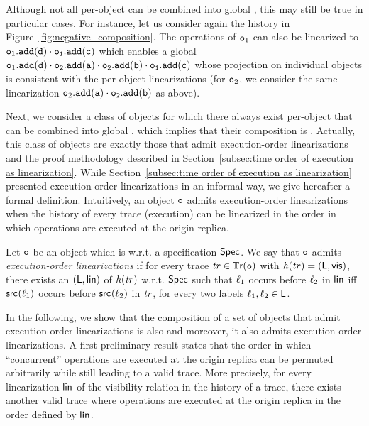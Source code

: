 Although not all per-object  can be combined into global , this may still be true in particular cases. For instance, let us consider again the history in Figure~\ref{fig:negative_composition}. The operations of $\mathtt{o}_1$ can also be linearized to $\aobj_1.\alabelshort[{\tt add}]{d}\cdot \aobj_1.\alabelshort[{\tt add}]{c}$ which enables a global \crdtlinearization{} $\aobj_1.\alabelshort[{\tt add}]{d}\cdot \aobj_2.\alabelshort[{\tt add}]{a}\cdot \aobj_2.\alabelshort[{\tt add}]{b}\cdot \aobj_1.\alabelshort[{\tt add}]{c}$ whose projection on individual objects is consistent with the per-object linearizations (for $\mathtt{o}_2$, we consider the same linearization $\aobj_2.\alabelshort[{\tt add}]{a}\cdot \aobj_2.\alabelshort[{\tt add}]{b}$ as above).

Next, we consider a class of \crdtlinearizable{} objects for which there always exist per-object  that can be combined into global , which implies that their composition is \crdtlinearizable{}. Actually, this class of objects are exactly those that admit execution-order linearizations and the proof methodology described in Section~\ref{subsec:time order of execution as linearization}. While Section~\ref{subsec:time order of execution as linearization} presented execution-order linearizations in an informal way, we give hereafter a formal definition. Intuitively, an object $\mathtt{o}$ admits execution-order linearizations when the history of every trace (execution) can be linearized in the order in which operations are executed at the origin replica.

\begin{definition}
Let $\mathtt{o}$ be an object which is \crdtlinearizable{} w.r.t. a specification $\mathsf{Spec}$. We say that $\mathtt{o}$ admits \emph{execution-order linearizations} if for every trace $\mathit{tr}\in\mathbb{T}\mathsf{r}(\mathtt{o})$ with $\mathit{h}({\mathit{tr})}=(\mathsf{L},\mathsf{vis})$, there exists an \crdtlinearization{} $(\mathsf{L},\mathsf{lin})$ of $\mathit{h}({\mathit{tr})}$ w.r.t. $\mathsf{Spec}$ such that $\ell_1$ occurs before $\ell_2$ in $\mathsf{lin}$ iff $\mathsf{src}_{}(\ell_1)$ occurs before $\mathsf{src}_{}(\ell_2)$ in $\mathit{tr}$, for every two labels $\ell_1,\ell_2\in\mathsf{L}$.
\end{definition}

In the following, we show that the composition of a set of \crdtlinearizable{} objects that admit execution-order linearizations is also \crdtlinearizable{} and moreover, it also admits execution-order linearizations. A first preliminary result states that the order in which ``concurrent'' operations are executed at the origin replica can be permuted arbitrarily while still leading to a valid trace. More precisely, for every linearization $\mathsf{lin}$ of the visibility relation in the history of a trace, there exists another valid trace where operations are executed at the origin replica in the order defined by $\mathsf{lin}$.

